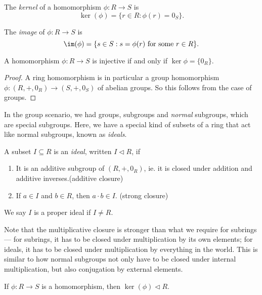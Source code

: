 \documentclass[a4paper]{article}
\begin{document}
\begin{defi}[Kernel]
  The \emph{kernel} of a homomorphism $\phi: R \to S$ is
  \[
    \ker (\phi) = \{r \in R: \phi(r) = 0_S\}.
  \]
\end{defi}

\begin{defi}[Image]
  The \emph{image} of $\phi: R \to S$ is
  \[
    \im(\phi) = \{s \in S: s = \phi(r) \text{ for some }r \in R\}.
  \]
\end{defi}

\begin{lemma}
  A homomorphism $\phi: R \to S$ is injective if and only if $\ker \phi = \{0_R\}$.
\end{lemma}

\begin{proof}
  A ring homomorphism is in particular a group homomorphism $\phi: (R, +, 0_R) \to (S, +, 0_S)$ of abelian groups. So this follows from the case of groups.
\end{proof}

In the group scenario, we had groups, subgroups and \emph{normal} subgroups, which are special subgroups. Here, we have a special kind of subsets of a ring that act like normal subgroups, known as \emph{ideals}.

\begin{defi}[Ideal]
  A subset $I \subseteq R$ is an \emph{ideal}, written $I \lhd R$, if
  \begin{enumerate}
    \item It is an additive subgroup of $(R, +, 0_R)$, ie. it is closed under addition and additive inverses.\hfill (additive closure)
    \item If $a \in I$ and $b \in R$, then $a \cdot b \in I$. \hfill (strong closure)
  \end{enumerate}
  We say $I$ is a proper ideal if $I \not= R$.
\end{defi}
Note that the multiplicative closure is stronger than what we require for subrings --- for subrings, it has to be closed under multiplication by its own elements; for ideals, it has to be closed under multiplication by everything in the world. This is similar to how normal subgroups not only have to be closed under internal multiplication, but also conjugation by external elements.

\begin{lemma}
  If $\phi: R \to S$ is a homomorphism, then $\ker(\phi)\lhd R$.
\end{lemma}
\end{document}
